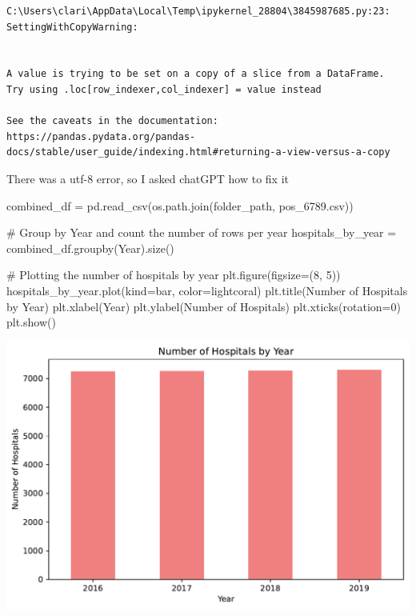 \documentclass[
  letterpaper,
  DIV=11,
  numbers=noendperiod]{scrartcl}
\newenvironment{Shaded}{\begin{snugshade}}{\end{snugshade}}
\newcommand{\CommentTok}[1]{\textcolor[rgb]{0.37,0.37,0.37}{#1}}
\newcommand{\DecValTok}[1]{\textcolor[rgb]{0.68,0.00,0.00}{#1}}
\newcommand{\NormalTok}[1]{\textcolor[rgb]{0.00,0.23,0.31}{#1}}
\newcommand{\OperatorTok}[1]{\textcolor[rgb]{0.37,0.37,0.37}{#1}}
\newcommand{\StringTok}[1]{\textcolor[rgb]{0.13,0.47,0.30}{#1}}
\begin{document}
\begin{verbatim}
C:\Users\clari\AppData\Local\Temp\ipykernel_28804\3845987685.py:23: SettingWithCopyWarning:


A value is trying to be set on a copy of a slice from a DataFrame.
Try using .loc[row_indexer,col_indexer] = value instead

See the caveats in the documentation: https://pandas.pydata.org/pandas-docs/stable/user_guide/indexing.html#returning-a-view-versus-a-copy
\end{verbatim}

There was a utf-8 error, so I asked chatGPT how to fix it

\begin{Shaded}
\begin{Highlighting}[]
\NormalTok{combined\_df }\OperatorTok{=}\NormalTok{ pd.read\_csv(os.path.join(folder\_path, }\StringTok{\textquotesingle{}pos\_6789.csv\textquotesingle{}}\NormalTok{))}

\CommentTok{\# Group by \textquotesingle{}Year\textquotesingle{} and count the number of rows per year}
\NormalTok{hospitals\_by\_year }\OperatorTok{=}\NormalTok{ combined\_df.groupby(}\StringTok{\textquotesingle{}Year\textquotesingle{}}\NormalTok{).size()}

\CommentTok{\# Plotting the number of hospitals by year}
\NormalTok{plt.figure(figsize}\OperatorTok{=}\NormalTok{(}\DecValTok{8}\NormalTok{, }\DecValTok{5}\NormalTok{))}
\NormalTok{hospitals\_by\_year.plot(kind}\OperatorTok{=}\StringTok{\textquotesingle{}bar\textquotesingle{}}\NormalTok{, color}\OperatorTok{=}\StringTok{\textquotesingle{}lightcoral\textquotesingle{}}\NormalTok{)}
\NormalTok{plt.title(}\StringTok{\textquotesingle{}Number of Hospitals by Year\textquotesingle{}}\NormalTok{)}
\NormalTok{plt.xlabel(}\StringTok{\textquotesingle{}Year\textquotesingle{}}\NormalTok{)}
\NormalTok{plt.ylabel(}\StringTok{\textquotesingle{}Number of Hospitals\textquotesingle{}}\NormalTok{)}
\NormalTok{plt.xticks(rotation}\OperatorTok{=}\DecValTok{0}\NormalTok{)}
\NormalTok{plt.show()}
\end{Highlighting}
\end{Shaded}

\includegraphics{pset4_ANSWERS_files/figure-pdf/cell-6-output-1.pdf}
\end{document}
